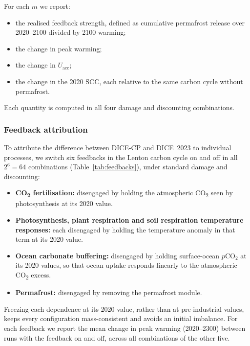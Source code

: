 For each $m$ we report:
\begin{itemize}
\item the realised feedback strength, defined as cumulative permafrost release over 2020--2100 divided by 2100 warming;
\item the change in peak warming;
\item the change in $U_{\text{acc}}$;
\item the change in the 2020 SCC, each relative to the same carbon cycle without permafrost.
\end{itemize}
Each quantity is computed in all four damage and discounting combinations.

\subsubsection{Feedback attribution}
To attribute the difference between DICE-CP and DICE~2023 to individual processes, we switch six feedbacks in the Lenton carbon cycle on and off in all $2^6 = 64$ combinations (Table~\ref{tab:feedbacks}), under standard damage and discounting:
\begin{itemize}
\item \textbf{CO\textsubscript{2} fertilisation:} disengaged by holding the atmospheric CO\textsubscript{2} seen by photosynthesis at its 2020 value.
\item \textbf{Photosynthesis, plant respiration and soil respiration temperature responses:} each disengaged by holding the temperature anomaly in that term at its 2020 value.
\item \textbf{Ocean carbonate buffering:} disengaged by holding surface-ocean $p\text{CO}_2$ at its 2020 values, so that ocean uptake responds linearly to the atmospheric CO\textsubscript{2} excess.
\item \textbf{Permafrost:} disengaged by removing the permafrost module.
\end{itemize}
Freezing each dependence at its 2020 value, rather than at pre-industrial values, keeps every configuration mass-consistent and avoids an initial imbalance. For each feedback we report the mean change in peak warming (2020--2300) between runs with the feedback on and off, across all combinations of the other five.
